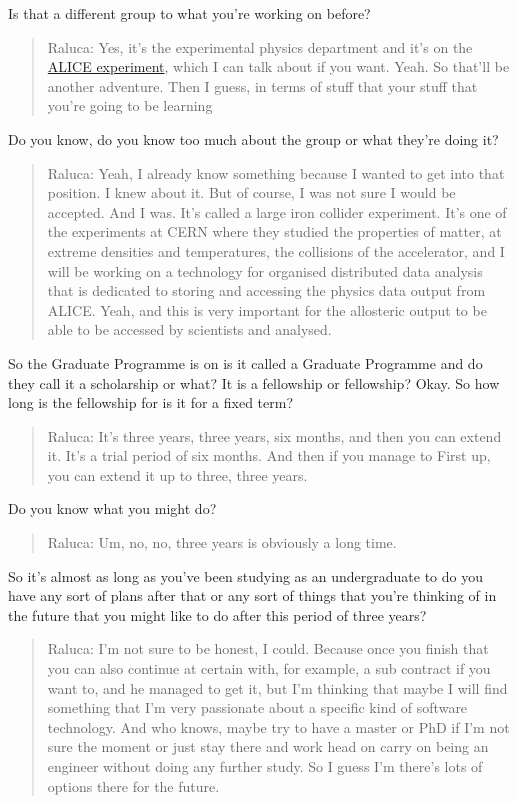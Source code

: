 \documentclass[
]{book}
\begin{document}
Is that a different group to what you're working on before?

\begin{quote}
Raluca: Yes, it's the experimental physics department and it's on the \href{https://en.wikipedia.org/wiki/ALICE_experiment}{ALICE experiment}, which I can talk about if you want. Yeah. So that'll be another adventure. Then I guess, in terms of stuff that your stuff that you're going to be learning
\end{quote}

Do you know, do you know too much about the group or what they're doing it?

\begin{quote}
Raluca: Yeah, I already know something because I wanted to get into that position. I knew about it. But of course, I was not sure I would be accepted. And I was. It's called a large iron collider experiment. It's one of the experiments at CERN where they studied the properties of matter, at extreme densities and temperatures, the collisions of the accelerator, and I will be working on a technology for organised distributed data analysis that is dedicated to storing and accessing the physics data output from ALICE. Yeah, and this is very important for the allosteric output to be able to be accessed by scientists and analysed.
\end{quote}

So the Graduate Programme is on is it called a Graduate Programme and do they call it a scholarship or what? It is a fellowship or fellowship? Okay. So how long is the fellowship for is it for a fixed term?

\begin{quote}
Raluca: It's three years, three years, six months, and then you can extend it. It's a trial period of six months. And then if you manage to First up, you can extend it up to three, three years.
\end{quote}

Do you know what you might do?

\begin{quote}
Raluca: Um, no, no, three years is obviously a long time.
\end{quote}

So it's almost as long as you've been studying as an undergraduate to do you have any sort of plans after that or any sort of things that you're thinking of in the future that you might like to do after this period of three years?

\begin{quote}
Raluca: I'm not sure to be honest, I could. Because once you finish that you can also continue at certain with, for example, a sub contract if you want to, and he managed to get it, but I'm thinking that maybe I will find something that I'm very passionate about a specific kind of software technology. And who knows, maybe try to have a master or PhD if I'm not sure the moment or just stay there and work head on carry on being an engineer without doing any further study. So I guess I'm there's lots of options there for the future.
\end{quote}
\end{document}
